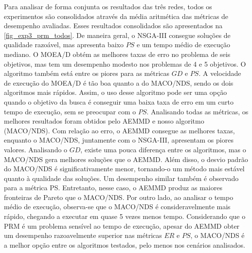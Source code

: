 Para analisar de forma conjunta os resultados das três redes, todos os experimentos são consolidados através da média aritmética das métricas de desempenho avaliadas. Esses resultados consolidados são apresentados na \autoref{fig_exp3_prm_todos}. De maneira geral, o NSGA-III consegue soluções de qualidade razoável, mas apresenta baixo $PS$ e um tempo médio de execução mediano. O MOEA/D obtém as melhores taxas de erro no problema de seis objetivos, mas tem um desempenho modesto nos problemas de 4 e 5 objetivos. O algoritmo também está entre os piores para as métricas $GD$ e $PS$. A velocidade de execução do MOEA/D é tão boa quanto a do MACO/NDS, sendo os dois algoritmos mais rápidos. Assim, o uso desse algoritmo pode ser uma opção quando o objetivo da busca é conseguir uma baixa taxa de erro em um curto tempo de execução, sem se preocupar com o $PS$. Analisando todas as métricas, os melhores resultados foram obtidos pelo AEMMD e nosso algoritmo (MACO/NDS). Com relação ao erro, o AEMMD consegue as melhores taxas, enquanto o MACO/NDS, juntamente com o NSGA-III, apresentam os piores valores. Analisando o $GD$, existe uma pouca diferença entre os algoritmos, mas o MACO/NDS gera melhores soluções que o AEMMD. Além disso, o desvio padrão do MACO/NDS é significativamente menor, tornando-o um método mais estável quanto à qualidade das soluções. Um desempenho similar também é observado para a métrica PS. Entretanto, nesse caso, o AEMMD produz as maiores fronteiras de Pareto que o MACO/NDS. Por outro lado, ao analisar o tempo médio de execução, observa-se que o MACO/NDS é consideravelmente mais rápido, chegando a executar em quase 5 vezes menos tempo. Considerando que o PRM é um problema sensível ao tempo de execução, apesar do AEMMD obter um desempenho razoavelmente superior nas métricas $ER$ e $PS$, o MACO/NDS é a melhor opção entre os algoritmos testados, pelo menos nos cenários analisados.

